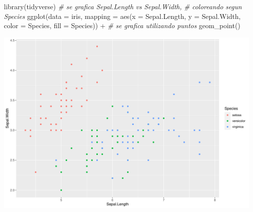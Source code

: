 \documentclass[
  10pt,
  ignorenonframetext,
]{beamer}
\newenvironment{Shaded}{\begin{snugshade}}{\end{snugshade}}
\newcommand{\AttributeTok}[1]{\textcolor[rgb]{0.77,0.63,0.00}{#1}}
\newcommand{\CommentTok}[1]{\textcolor[rgb]{0.56,0.35,0.01}{\textit{#1}}}
\newcommand{\FunctionTok}[1]{\textcolor[rgb]{0.00,0.00,0.00}{#1}}
\newcommand{\NormalTok}[1]{#1}
\newcommand{\SpecialCharTok}[1]{\textcolor[rgb]{0.00,0.00,0.00}{#1}}
\begin{document}
\begin{frame}[fragile]{}
\protect\hypertarget{section-8}{}

\begin{Shaded}
\begin{Highlighting}[]
\FunctionTok{library}\NormalTok{(tidyverse)}
  \CommentTok{\# se grafica Sepal.Length vs Sepal.Width,}
  \CommentTok{\# coloreando segun Species}
\FunctionTok{ggplot}\NormalTok{(}\AttributeTok{data =}\NormalTok{ iris,}
       \AttributeTok{mapping =} \FunctionTok{aes}\NormalTok{(}\AttributeTok{x =}\NormalTok{ Sepal.Length, }
              \AttributeTok{y =}\NormalTok{ Sepal.Width, }
              \AttributeTok{color =}\NormalTok{ Species, }
              \AttributeTok{fill =}\NormalTok{ Species)) }\SpecialCharTok{+}
  \CommentTok{\# se grafica utilizando puntos}
  \FunctionTok{geom\_point}\NormalTok{() }
\end{Highlighting}
\end{Shaded}
\end{frame}

\begin{frame}{}
\protect\hypertarget{section-9}{}

\includegraphics{claseIntro_practico12_final_files/figure-beamer/unnamed-chunk-18-1.pdf}
\end{frame}
\end{document}
